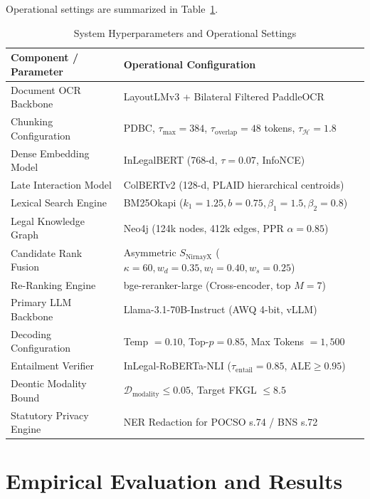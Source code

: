 \documentclass[conference]{IEEEtran}
\begin{document}
Operational settings are summarized in Table~\ref{tab:hyperparameters}.

\begin{table}[!t]
\caption{System Hyperparameters and Operational Settings}
\label{tab:hyperparameters}
\centering
\footnotesize
\setlength{\tabcolsep}{4pt}
\begin{tabularx}{\columnwidth}{l>{\raggedright\arraybackslash}X}
\toprule
\textbf{Component / Parameter} & \textbf{Operational Configuration} \\
\midrule
Document OCR Backbone & LayoutLMv3 + Bilateral Filtered PaddleOCR \\
Chunking Configuration & PDBC, $\tau_{\max}=384$, $\tau_{\text{overlap}}=48$ tokens, $\tau_{\mathcal{H}}=1.8$ \\
Dense Embedding Model & InLegalBERT (768-d, $\tau=0.07$, InfoNCE) \\
Late Interaction Model & ColBERTv2 (128-d, PLAID hierarchical centroids) \\
Lexical Search Engine & BM25Okapi ($k_1=1.25, b=0.75, \beta_1=1.5, \beta_2=0.8$) \\
Legal Knowledge Graph & Neo4j (124k nodes, 412k edges, PPR $\alpha=0.85$) \\
Candidate Rank Fusion & Asymmetric $S_{\text{NirnayX}}$ ($\kappa=60, w_{d}=0.35, w_{l}=0.40, w_{s}=0.25$) \\
Re-Ranking Engine & bge-reranker-large (Cross-encoder, top $M=7$) \\
Primary LLM Backbone & Llama-3.1-70B-Instruct (AWQ 4-bit, vLLM) \\
Decoding Configuration & Temp $=0.10$, Top-$p=0.85$, Max Tokens $=1,500$ \\
Entailment Verifier & InLegal-RoBERTa-NLI ($\tau_{\text{entail}}=0.85$, $\text{ALE}\ge 0.95$) \\
Deontic Modality Bound & $\mathcal{D}_{\text{modality}} \le 0.05$, Target FKGL $\le 8.5$ \\
Statutory Privacy Engine & NER Redaction for POCSO s.74 / BNS s.72~\cite{dpdpa2023} \\
\bottomrule
\end{tabularx}
\end{table}

\section{Empirical Evaluation and Results}
\end{document}
